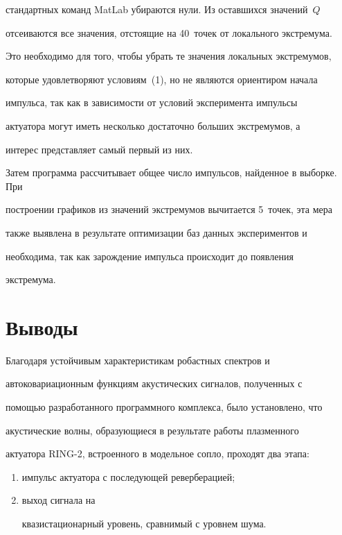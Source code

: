 стандартных команд MatLab убираются нули. Из оставшихся значений~$Q$ 


отсеиваются все значения, отстоящие на 40~точек от локального экстремума. 


Это необходимо для того, чтобы убрать те значения локальных экстремумов, 


которые удовлетворяют условиям~(1), но не являются ориентиром начала 


импульса, так как в зависимости от условий эксперимента импульсы 


актуатора могут иметь несколько достаточно больших экстремумов, а 


интерес представляет самый первый из них.


     Затем программа рассчитывает общее число импульсов, найденное в выборке. При 


построении графиков из значений экстремумов вычитается 5~точек, эта мера 


также выявлена в результате оптимизации баз данных экспериментов и 


необходима, так как зарождение импульса происходит до появления 


экстремума.


     


    \section{Выводы}


    


     Благодаря устойчивым характеристикам робастных спектров и 


автоковариационным функциям акустических сигналов, полученных с 


помощью разработанного программного комплекса, было установлено, что 


акустические волны, образующиеся в результате работы плазменного 


актуатора RING-2, встроенного в модельное сопло, проходят два этапа: 


\begin{enumerate}[(1)]


\item импульс актуатора с последующей реверберацией; 


\item выход сигнала на 


квазистационарный уровень, сравнимый с уровнем шума.


\end{enumerate}





